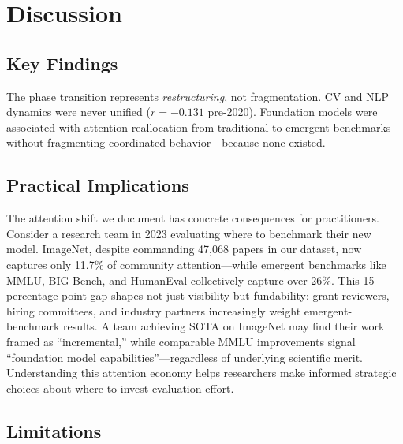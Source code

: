 \section{Discussion}
\label{sec:discussion}

\subsection{Key Findings}

The phase transition represents \emph{restructuring}, not fragmentation. CV and NLP dynamics were never unified ($r = -0.131$ pre-2020). Foundation models were associated with attention reallocation from traditional to emergent benchmarks without fragmenting coordinated behavior---because none existed.

\subsection{Practical Implications}

The attention shift we document has concrete consequences for practitioners. Consider a research team in 2023 evaluating where to benchmark their new model. ImageNet, despite commanding 47,068 papers in our dataset, now captures only 11.7\% of community attention---while emergent benchmarks like MMLU, BIG-Bench, and HumanEval collectively capture over 26\%. This 15 percentage point gap shapes not just visibility but fundability: grant reviewers, hiring committees, and industry partners increasingly weight emergent-benchmark results. A team achieving SOTA on ImageNet may find their work framed as ``incremental,'' while comparable MMLU improvements signal ``foundation model capabilities''---regardless of underlying scientific merit. Understanding this attention economy helps researchers make informed strategic choices about where to invest evaluation effort.

\subsection{Limitations}

